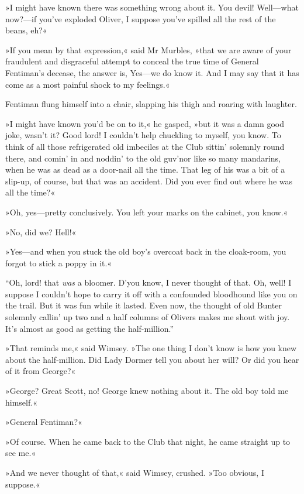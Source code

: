 »I might have known there was something wrong about it. You devil! Well\allowbreak---\allowbreak what now?---if you've exploded Oliver, I suppose you've spilled all the rest of the beans, eh?«

»If you mean by that expression,« said Mr Murbles, »that we are aware of your fraudulent and disgraceful attempt to conceal the true time of General Fentiman's decease, the answer is, Yes\allowbreak---\allowbreak we do know it. And I may say that it has come as a most painful shock to my feelings.«

Fentiman flung himself into a chair, slapping his thigh and roaring with laughter.

»I might have known you'd be on to it,« he gasped, »but it was a damn good joke, wasn't it? Good lord! I couldn't help chuckling to myself, you know. To think of all those refrigerated old imbeciles at the Club sittin' solemnly round there, and comin' in and noddin' to the old guv'nor like so many mandarins, when he was as dead as a door-nail all the time. That leg of his was a bit of a slip-up, of course, but that was an accident. Did you ever find out where he was all the time?«

»Oh, yes\allowbreak---\allowbreak pretty conclusively. You left your marks on the cabinet, you know.«

»No, did we? Hell!«

»Yes\allowbreak---\allowbreak and when you stuck the old boy's overcoat back in the cloak-room, you forgot to stick a poppy in it.«

\enquote{Oh, lord! that \textit{was} a bloomer. D'you know, I never thought of that. Oh, well! I suppose I couldn't hope to carry it off with a confounded bloodhound like you on the trail. But it was fun while it lasted. Even now, the thought of old Bunter solemnly callin' up two and a half columns of Olivers makes me shout with joy. It's almost as good as getting the half-million.}

»That reminds me,« said Wimsey. »The one thing I don't know is how you knew about the half-million. Did Lady Dormer tell you about her will? Or did you hear of it from George?«

»George? Great Scott, no! George knew nothing about it. The old boy told me himself.«

»General Fentiman?«

»Of course. When he came back to the Club that night, he came straight up to see me.«

»And we never thought of that,« said Wimsey, crushed. »Too obvious, I suppose.«

